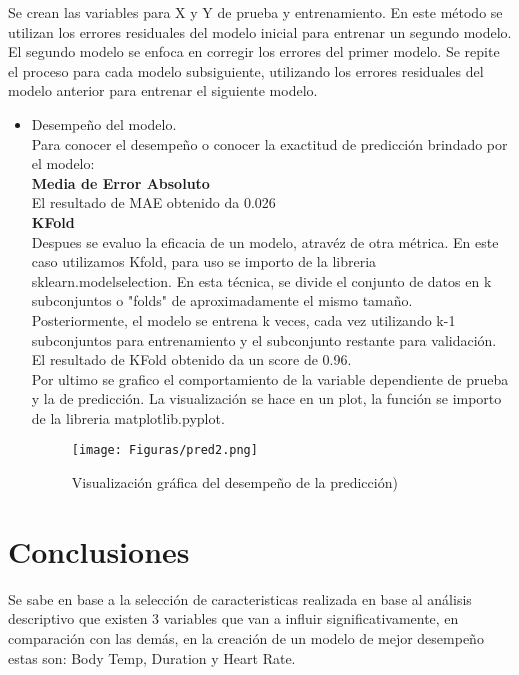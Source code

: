 \documentclass[5p,times,authoryear]{sciarticle}
\begin{document}
\begin{multicols}{2}
{Se crean las variables para X y Y de prueba y entrenamiento.
En este método se utilizan los errores residuales del modelo inicial para entrenar un segundo modelo. El segundo modelo se enfoca en corregir los errores del primer modelo. Se repite el proceso para cada modelo subsiguiente, utilizando los errores residuales del modelo anterior para entrenar el siguiente modelo.
\begin{itemize}
\item Desempeño del modelo.\\
Para conocer el desempeño o conocer la exactitud de predicción brindado por el modelo:\\

\textbf{Media de Error Absoluto} \\
El resultado de MAE obtenido da 0.026\\

\textbf{KFold} \\
Despues se evaluo la eficacia de un modelo, atravéz de otra métrica. En este caso utilizamos Kfold, para uso se importo de la libreria sklearn.modelselection.
En esta técnica, se divide el conjunto de datos en k subconjuntos o  "folds" de aproximadamente el mismo tamaño. Posteriormente, el modelo se entrena k veces, cada vez utilizando k-1 subconjuntos para entrenamiento y el subconjunto restante para validación.
El resultado de KFold obtenido da un score de 0.96.\\
Por ultimo se grafico el comportamiento de la variable dependiente de prueba y la de predicción. La visualización se hace en un plot, la función se importo de la libreria matplotlib.pyplot.

\begin{figure}[H]
\centering
  \texttt{[image: Figuras/pred2.png]}\\
  \caption{Visualización gráfica del desempeño de la predicción) }\label{fig1}
\end{figure}
\end{itemize}
\section{Conclusiones}

Se sabe en base a la selección de caracteristicas realizada en base al análisis descriptivo que existen 3 variables que van a influir significativamente, en comparación con las demás, en la creación de un modelo de mejor desempeño estas son: Body Temp, Duration y Heart Rate.\\

}
\end{multicols}
\end{document}
